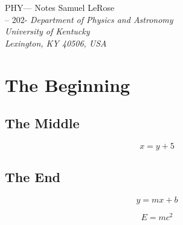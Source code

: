 \documentclass[12pt]{article}
\newcommand{\name}{Samuel LeRose}              %
\newcommand{\semester}{-- 202-}        %
\newcommand{\hwTitle}{PHY--- Notes}  %
\begin{document}
\begin{titlepage}
\begin{center}
    \vspace*{1.5in}
    {\Large{\hwTitle}}
    \vskip 0.25in \name\\
    \semester
    \vskip 0.25in {\it Department of Physics and Astronomy\\ University of Kentucky\\ Lexington, KY 40506, USA}
\end{center}
\vskip 0.5in
\end{titlepage}


\chapter{The Beginning}

\section{The Middle}

\lipsum[1]

\begin{equation}
    x=y+5
\end{equation}

\section[3]{The End}    %

\lipsum[2]

\begin{equation}
    y=mx+b
\end{equation}

\begin{equation}
    E=mc^2
\end{equation}
\end{document}
